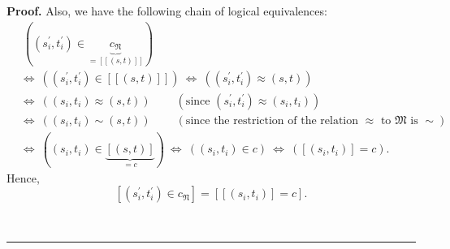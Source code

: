 \documentclass[numbers=enddot,12pt,final,onecolumn,notitlepage,abstracton]{scrartcl}%
\theoremstyle{definition}
\newenvironment{proof}[1][Proof]{\noindent\textbf{#1.} }{\ \rule{0.5em}{0.5em}}
\begin{document}
\begin{proof}
Also, we have the following chain of logical equivalences:%
\begin{align*}
&  \ \left(  \left(  s_{i}^{\prime},t_{i}^{\prime}\right)  \in
\underbrace{c_{\mathfrak{N}}}_{=\left[  \left[  \left(  s,t\right)  \right]
\right]  }\right) \\
&  \Longleftrightarrow\ \left(  \left(  s_{i}^{\prime},t_{i}^{\prime}\right)
\in\left[  \left[  \left(  s,t\right)  \right]  \right]  \right)
\ \Longleftrightarrow\ \left(  \left(  s_{i}^{\prime},t_{i}^{\prime}\right)
\approx\left(  s,t\right)  \right) \\
&  \Longleftrightarrow\ \left(  \left(  s_{i},t_{i}\right)  \approx\left(
s,t\right)  \right)  \ \ \ \ \ \ \ \ \ \ \left(  \text{since }\left(
s_{i}^{\prime},t_{i}^{\prime}\right)  \approx\left(  s_{i},t_{i}\right)
\right) \\
&  \Longleftrightarrow\ \left(  \left(  s_{i},t_{i}\right)  \sim\left(
s,t\right)  \right)  \ \ \ \ \ \ \ \ \ \ \left(  \text{since the restriction
of the relation }\approx\text{ to }\mathfrak{M}\text{ is }\sim\right) \\
&  \Longleftrightarrow\ \left(  \left(  s_{i},t_{i}\right)  \in
\underbrace{\left[  \left(  s,t\right)  \right]  }_{=c}\right)
\ \Longleftrightarrow\ \left(  \left(  s_{i},t_{i}\right)  \in c\right)
\ \Longleftrightarrow\ \left(  \left[  \left(  s_{i},t_{i}\right)  \right]
=c\right)  .
\end{align*}
Hence,%
\begin{equation}
\left[  \left(  s_{i}^{\prime},t_{i}^{\prime}\right)  \in c_{\mathfrak{N}%
}\right]  =\left[  \left[  \left(  s_{i},t_{i}\right)  \right]  =c\right]  .
\label{pf.thm.BCL.a.hasdiff1.eq2}%
\end{equation}



\end{proof}
\end{document}
